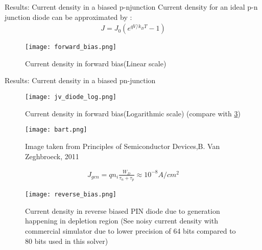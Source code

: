\documentclass{beamer}
\begin{document}
\begin{frame}{Results: Current density in a biased p-njunction}
Current density for an ideal p-n junction diode can be approximated by :
\begin{align*}
J = J_0 (e^{qV/k_BT}-1) 
\end{align*}

\begin{figure}[h!]
     \centering
        \texttt{[image: forward\_bias.png]}
         \caption{Current density in forward bias(Linear scale)}
         \label{fig:jv}
     \end{figure}

\end{frame}

\begin{frame}{Results: Current density in a biased pn-junction}

\begin{figure}[h!]
     \centering
        \texttt{[image: jv\_diode\_log.png]}
         \caption{Current density in forward bias(Logarithmic scale) (compare with \ref{fig:jv_bart})}
		 \label{fig:jvl}     
     \end{figure}

\end{frame}

\begin{frame}
\begin{figure}[h!]
     \centering
        \texttt{[image: bart.png]}
         \caption{Image taken from Principles of Semiconductor Devices,B. Van Zeghbroeck, 2011}
		 \label{fig:jv_bart}     
     \end{figure}
\end{frame}


\begin{frame}

\begin{align*}
J_{gen} = q n_i \frac{W_D}{\tau_n + \tau_p} \approx 10^{-8} A/cm^2
\end{align*}


\begin{figure}[h!]
     \centering
        \texttt{[image: reverse\_bias.png]}
         \caption{Current density in reverse biased PIN diode due to generation happening in depletion region (See noisy current density with commercial simulator due to lower precision of 64 bits compared to 80 bits used in this solver)}
		 \label{fig:jvr}     
     \end{figure}         
\end{frame}
\end{document}
